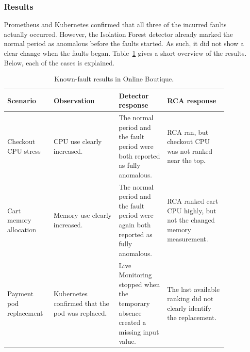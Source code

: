 \subsubsection{Results}

Prometheus and Kubernetes confirmed that all three of the incurred faults actually occurred. However, the Isolation Forest detector already marked the normal period as anomalous before the faults started. As such, it did not show a clear change when the faults began. Table~\ref{tab:h9-known-fault-results} gives a short overview of the results. Below, each of the cases is explained.

\begin{table}[H]
    \centering
    \small
    \caption{Known-fault results in Online Boutique.}
    \label{tab:h9-known-fault-results}
    \begin{tabular}{|p{0.18\linewidth}|p{0.27\linewidth}|p{0.20\linewidth}|p{0.25\linewidth}|}
        \hline
        Scenario & Observation & Detector response & RCA response \\
        \hline
        Checkout CPU stress & CPU use clearly increased. & The normal period and the fault period were both reported as fully anomalous. & RCA ran, but checkout CPU was not ranked near the top. \\
        \hline
        Cart memory allocation & Memory use clearly increased. & The normal period and the fault period were again both reported as fully anomalous. & RCA ranked cart CPU highly, but not the changed memory measurement. \\
        \hline
        Payment pod replacement & Kubernetes confirmed that the pod was replaced. & Live Monitoring stopped when the temporary absence created a missing input value. & The last available ranking did not clearly identify the replacement. \\
        \hline
    \end{tabular}
\end{table}



